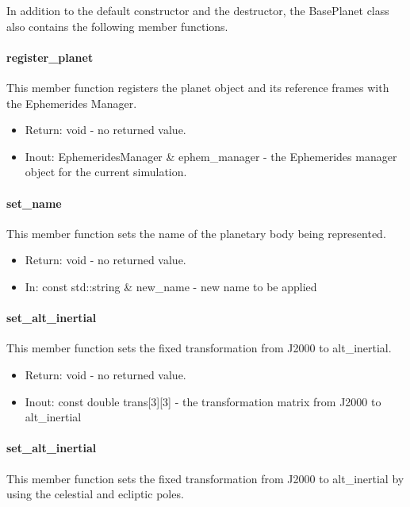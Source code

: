 In addition to the default constructor and the destructor,
the BasePlanet class also contains the following member functions.

\paragraph{register\_planet}

This member function registers the planet object and its reference frames
with the Ephemerides Manager.

\begin{itemize}
\item{Return:} void - no returned value.
\item{Inout:} EphemeridesManager \& ephem\_manager - the Ephemerides manager
object for the current simulation.
\end{itemize}

\paragraph{set\_name}

This member function sets the name of the planetary body being represented.

\begin{itemize}
\item{Return:} void - no returned value.
\item{In:} const std::string \& new\_name - new name to be applied
\end{itemize}

\paragraph{set\_alt\_inertial}

This member function sets the fixed transformation from J2000 to alt\_inertial.

\begin{itemize}
\item{Return:} void - no returned value.
\item{Inout:} const double trans[3][3] - the transformation matrix from J2000
to alt\_inertial
\end{itemize}

\paragraph{set\_alt\_inertial}

This member function sets the fixed transformation from J2000 to alt\_inertial
by using the celestial and ecliptic poles.

